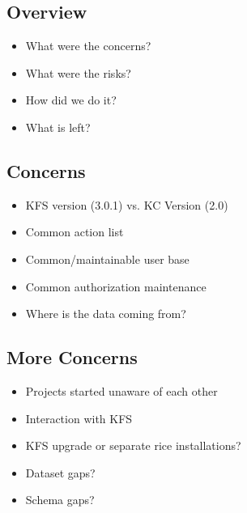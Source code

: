 \documentclass[12pt,notitlepage]{article}
\author{Leo Przybylski}
\begin{document}
  \W \begin{s5presentation}
  \maketitle

%
%
  \W \begin{s5slide}
    \section{Overview}

    \begin{itemize}
      \item What were the concerns?
      \item What were the risks?
      \item How did we do it?
      \item What is left?
    \end{itemize}
  \W \end{s5slide}

%
%
  \W \begin{s5slide}
    \section{Concerns}
    \begin{itemize}
    \item KFS version (3.0.1) vs. KC Version (2.0)
    \item Common action list
    \item Common/maintainable user base
    \item Common authorization maintenance
    \item Where is the data coming from?
    \end{itemize}
  \W \end{s5slide}

%
%
  \W \begin{s5slide}
    \section{More Concerns}
    \begin{itemize}
    \item Projects started unaware of each other
    \item Interaction with KFS
    \item KFS upgrade or separate rice installations?
    \item Dataset gaps?
    \item Schema gaps?
    \end{itemize}
  \W \end{s5slide}


\end{s5presentation}
\end{document}
